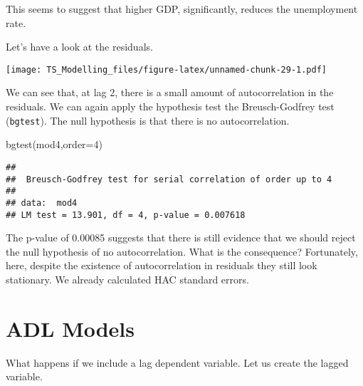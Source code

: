 \documentclass[
]{article}
\newenvironment{Shaded}{\begin{snugshade}}{\end{snugshade}}
\newcommand{\AttributeTok}[1]{\textcolor[rgb]{0.77,0.63,0.00}{#1}}
\newcommand{\DecValTok}[1]{\textcolor[rgb]{0.00,0.00,0.81}{#1}}
\newcommand{\FunctionTok}[1]{\textcolor[rgb]{0.00,0.00,0.00}{#1}}
\newcommand{\NormalTok}[1]{#1}
\newcommand{\SpecialCharTok}[1]{\textcolor[rgb]{0.00,0.00,0.00}{#1}}
\newcommand{\StringTok}[1]{\textcolor[rgb]{0.31,0.60,0.02}{#1}}
\begin{document}
This seems to suggest that higher GDP, significantly, reduces the
unemployment rate.

Let's have a look at the residuals.

\begin{Shaded}
\end{Shaded}

\texttt{[image: TS\_Modelling\_files/figure-latex/unnamed-chunk-29-1.pdf]}

We can see that, at lag 2, there is a small amount of autocorrelation in
the residuals. We can again apply the hypothesis test the
Breusch-Godfrey test (\texttt{bgtest}). The null hypothesis is that
there is no autocorrelation.

\begin{Shaded}
\begin{Highlighting}[]
\FunctionTok{bgtest}\NormalTok{(mod4,}\AttributeTok{order=}\DecValTok{4}\NormalTok{)}
\end{Highlighting}
\end{Shaded}

\begin{verbatim}
## 
##  Breusch-Godfrey test for serial correlation of order up to 4
## 
## data:  mod4
## LM test = 13.901, df = 4, p-value = 0.007618
\end{verbatim}

The p-value of 0.00085 suggests that there is still evidence that we
should reject the null hypothesis of no autocorrelation. What is the
consequence? Fortunately, here, despite the existence of autocorrelation
in residuals they still look stationary. We already calculated HAC
standard errors.

\hypertarget{adl-models}{%
\section{ADL Models}\label{adl-models}}

What happens if we include a lag dependent variable. Let us create the
lagged variable.
\end{document}
